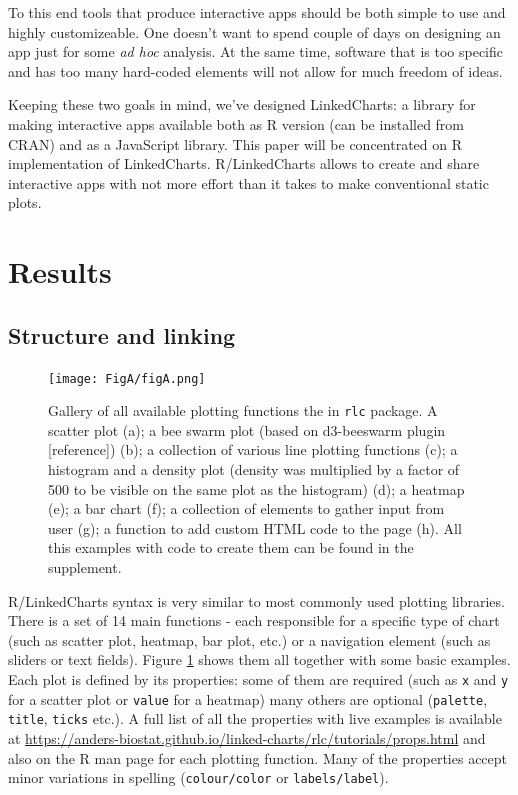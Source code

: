 \documentclass[twocolumn,10pt]{article}
\begin{document}
To this end tools that produce interactive apps should be both simple to use and highly customizeable. One doesn't want to spend couple of days on designing an app just for some \emph{ad hoc} analysis. At the same time, software that is too specific and has too many hard-coded elements will not allow for much freedom of ideas.

Keeping these two goals in mind, we've designed LinkedCharts: a library for making interactive apps available both as R version (can be installed from CRAN) and as a JavaScript library. This paper will be concentrated on R implementation of LinkedCharts. R/LinkedCharts allows to create and share interactive apps with not more effort than it takes to make conventional static plots.

\section{Results}
\subsection{Structure and linking}
\begin{figure}
	\texttt{[image: FigA/figA.png]}
	\caption{Gallery of all available plotting functions the in \texttt{rlc} package. A scatter plot (a); a bee swarm plot (based on d3-beeswarm plugin [reference]) (b); a collection of various line plotting functions (c); a histogram and a density plot (density was multiplied by a factor of 500 to be visible on the same plot as the histogram) (d); a heatmap (e); a bar chart (f); a collection of elements to gather input from user (g); a function to add custom HTML code to the page (h). All this examples with code to create them can be found in the supplement.}
	\label{FigA}
\end{figure}

R/LinkedCharts syntax is very similar to most commonly used plotting libraries. There is a set of 14 main functions - each responsible for a specific type of chart (such as scatter plot, heatmap, bar plot, etc.) or a navigation element (such as sliders or text fields). Figure \ref{FigA} shows them all together with some basic examples. Each plot is defined by its properties: some of them are required (such as \texttt{x} and \texttt{y} for a scatter plot or \texttt{value} for a heatmap) many others are optional (\texttt{palette}, \texttt{title}, \texttt{ticks} etc.). A full list of all the properties with live examples is available at \url{https://anders-biostat.github.io/linked-charts/rlc/tutorials/props.html} and also on the R man page for each plotting function. Many of the properties accept minor variations in spelling (\texttt{colour/color} or \texttt{labels/label}).
\end{document}
